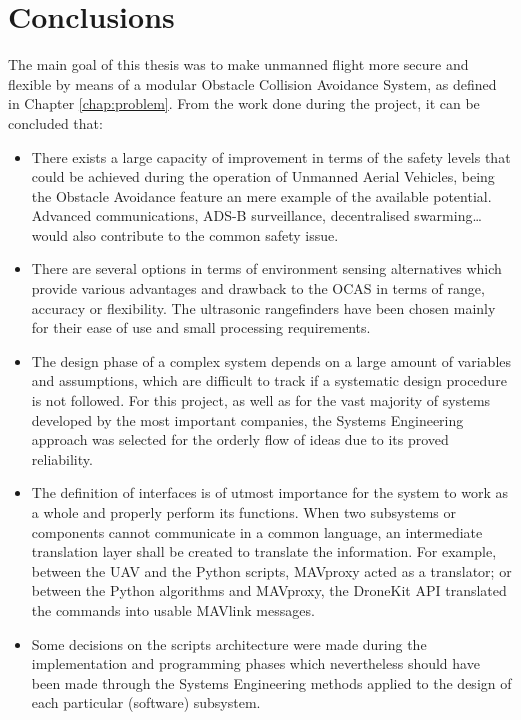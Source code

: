 
\let\textcircled=\pgftextcircled
\chapter{Conclusions} \label{chapter:conclusions}

The main goal of this thesis was to make unmanned flight more secure and flexible by means of a modular Obstacle Collision Avoidance System, as defined in Chapter \ref{chap:problem}. From the work done during the project, it can be concluded that:

\begin{itemize}

	\item There exists a large capacity of improvement in terms of the safety levels that could be achieved during the operation of Unmanned Aerial Vehicles, being the Obstacle Avoidance feature an mere example of the available potential.
		Advanced communications, ADS-B surveillance, decentralised swarming\ldots would also contribute to the common safety issue.

	\item There are several options in terms of environment sensing alternatives which provide various advantages and drawback to the OCAS in terms of range, accuracy or flexibility.
		The ultrasonic rangefinders have been chosen mainly for their ease of use and small processing requirements.

	\item The design phase of a complex system depends on a large amount of variables and assumptions, which are difficult to track if a systematic design procedure is not followed.
		For this project, as well as for the vast majority of systems developed by the most important companies, the Systems Engineering approach was selected for the orderly flow of ideas due to its proved reliability.

	\item The definition of interfaces is of utmost importance for the system to work as a whole and properly perform its functions.
		When two subsystems or components cannot communicate in a common language, an intermediate translation layer shall be created to translate the information.
		For example, between the UAV and the Python scripts, MAVproxy acted as a translator; or between the Python algorithms and MAVproxy, the DroneKit API translated the commands into usable MAVlink messages.

	\item Some decisions on the scripts architecture were made during the implementation and programming phases which nevertheless should have been made through the Systems Engineering methods applied to the design of each particular (software) subsystem.


\end{itemize}
